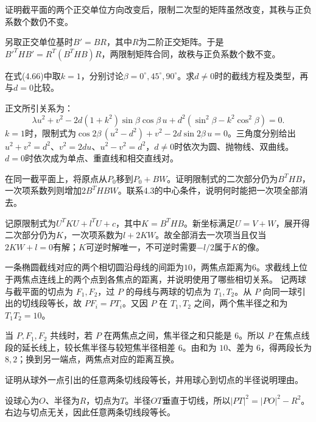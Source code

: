 证明截平面的两个正交单位方向改变后，限制二次型的矩阵虽然改变，其秩与正负系数个数仍不变。
\par
\solutionanswer
另取正交单位基时\(B'=BR\)，其中\(R\)为二阶正交矩阵。于是\(B'^THB'=R^T(B^THB)R\)，两限制矩阵合同，故秩与正负系数个数不变。


在式\textup{(4.66)}中取\(k=1\)，分别讨论\(\beta=0^\circ,45^\circ,90^\circ\)。求\(d\ne0\)时的截线方程及类型，再与\(d=0\)比较。
\par

\par\smallskip\noindent 正文所引关系为：
\begin{equation*}
\lambda u^2+v^2-2d(1+k^2)\sin\beta\cos\beta\,u
    +d^2(\sin^2\beta-k^2\cos^2\beta)=0 .
\end{equation*}
\solutionanswer
\(k=1\)时，限制式为\(\cos2\beta\,(u^2-d^2)+v^2-2d\sin2\beta\,u=0\)。三角度分别给出\(u^2+v^2=d^2\)、\(v^2=2du\)、\(u^2-v^2=d^2\)，\(d\ne0\)时依次为圆、抛物线、双曲线。\(d=0\)时依次成为单点、重直线和相交直线对。


在同一截平面上，将原点从\(P_0\)移到\(P_0+BW\)。证明限制式的二次部分仍为\(B^THB\)，一次项系数列则增加\(2B^THBW\)。联系4.3的中心条件，说明何时能把一次项全部消去。
\par
\solutionanswer
记原限制式为\(U^TKU+l^TU+c\)，其中\(K=B^THB\)。新坐标满足\(U=V+W\)，展开得二次部分仍为\(K\)，一次项系数为\(l+2KW\)。故全部消去一次项当且仅当\(2KW+l=0\)有解；\(K\)可逆时解唯一，不可逆时需要\(-l/2\)属于\(K\)的像。


一条椭圆截线对应的两个相切圆沿母线的间距为\(10\)，两焦点距离为\(6\)。求截线上位于两焦点连线上的两个点到各焦点的距离，并说明使用了哪些相切关系。
\solutionanswer
记两球与截平面的切点为 \(F_1,F_2\)，过 \(P\) 的母线与两球的切点为 \(T_1,T_2\)。从 \(P\) 向同一球引出的切线段等长，故 \(PF_i=PT_i\)。又因 \(P\) 在 \(T_1,T_2\) 之间，两个焦半径之和为 \(T_1T_2=10\)。

当 \(P,F_1,F_2\) 共线时，若 \(P\) 在两焦点之间，焦半径之和只能是 \(6\)。所以 \(P\) 在焦点线段的延长线上，较长焦半径与较短焦半径相差 \(6\)。由和为 \(10\)、差为 \(6\)，得两段长为 \(8,2\)；换到另一端点，两焦点对应的距离互换。


证明从球外一点引出的任意两条切线段等长，并用球心到切点的半径说明理由。
\par
\solutionanswer
设球心为\(O\)、半径为\(R\)，切点为\(T\)。半径\(OT\)垂直于切线，所以\(|PT|^2=|PO|^2-R^2\)。右边与切点无关，因此任意两条切线段等长。


